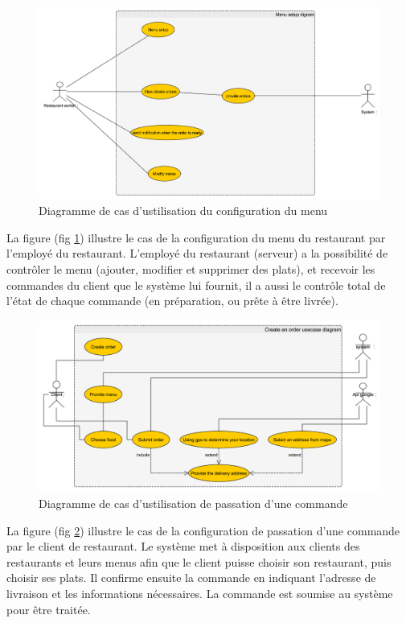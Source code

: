 \documentclass[french, a4paper, 12pt]{report}
\begin{document}
			
			\begin{figure}[!h]
  				\center
  				\includegraphics[width=15cm]{usecasemenu.png}
  				\caption{Diagramme de cas d'ustilisation du configuration du menu}
  				\label{fig:usecasemenu}
			\end{figure}
			
			La figure (fig \ref{fig:usecasemenu}) illustre le cas de la configuration du menu du restaurant par l'employé du restaurant. L'employé du restaurant (serveur) a la possibilité de contrôler
le menu (ajouter, modifier et supprimer des plats), et recevoir les commandes du client que le système lui fournit,
il a aussi le contrôle total de l'état de chaque commande (en préparation, ou prête à être livrée).
			
			\newpage
			\begin{figure}[!h]
  				\center
  				\includegraphics[width=15cm]{usecaseorder.png}
  				\caption{Diagramme de cas d'ustilisation de passation d'une commande}
  				\label{fig:usecaseorder}
			\end{figure}
			La figure (fig \ref{fig:usecaseorder}) illustre le cas de la configuration de passation d'une commande par le client de restaurant. Le système met à disposition aux clients des restaurants et leurs menus afin que le client puisse choisir son restaurant,
puis choisir ses plats. Il confirme ensuite la commande en indiquant l'adresse de livraison et les informations nécessaires. La commande est soumise au système pour être traitée.
			
\end{document}
